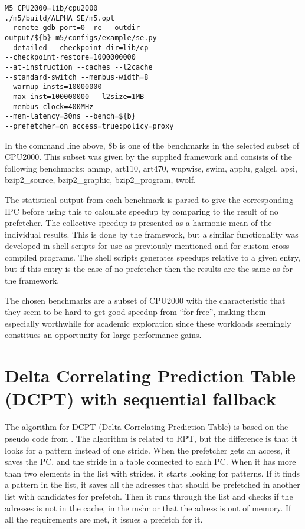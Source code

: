 \documentclass[12pt,journal,compsoc]{IEEEtran}
\begin{document}
\begin{verbatim}
M5_CPU2000=lib/cpu2000
./m5/build/ALPHA_SE/m5.opt
--remote-gdb-port=0 -re --outdir
output/${b} m5/configs/example/se.py
--detailed --checkpoint-dir=lib/cp
--checkpoint-restore=1000000000
--at-instruction --caches --l2cache
--standard-switch --membus-width=8
--warmup-insts=10000000
--max-inst=100000000 --l2size=1MB
--membus-clock=400MHz
--mem-latency=30ns --bench=${b}
--prefetcher=on_access=true:policy=proxy
\end{verbatim}

In the command line above, \${b} is one of the benchmarks in the selected
subset of CPU2000. This subset was given by the supplied framework and consists
of the following benchmarks: ammp, art110, art470, wupwise, swim, applu,
galgel, apsi, bzip2\_source, bzip2\_graphic, bzip2\_program, twolf.

The statistical output from each benchmark is parsed to give the corresponding
IPC before using this to calculate speedup by comparing to the result
of no prefetcher. The collective speedup is presented as a harmonic mean of
the individual results. This is done by the framework, but a similar
functionality was developed in shell scripts for use as previously mentioned
and for custom cross-compiled programs. The shell scripts generates
speedups relative to a given entry, but if this entry is the case of no
prefetcher then the results are the same as for the framework.

The chosen benchmarks are a subset of CPU2000 with the characteristic that
they seem to be hard to get good speedup from ``for free'', making
them especially worthwhile for academic exploration since these workloads
seemingly constitues an opportunity for large performance gains.

\section{Delta Correlating Prediction Table (DCPT) with sequential fallback}
The algorithm for DCPT (Delta Correlating Prediction Table) is based on the pseudo code from \cite{dcptpaper}.
The algorithm is related to RPT, but the difference is that it looks for a pattern instead of one stride.
When the prefetcher gets an access, it saves the PC, and the stride in a table connected to each PC. When it has more than two elements in the list with strides, it starts looking for patterns.
If it finds a pattern in the list, it saves all the adresses that should be prefetched in another list with candidates for prefetch.
Then it runs through the list and checks if the adresses is not in the cache, in the mshr or that the adress is out of memory. If all the requirements are met, it issues a prefetch for it.
\end{document}
